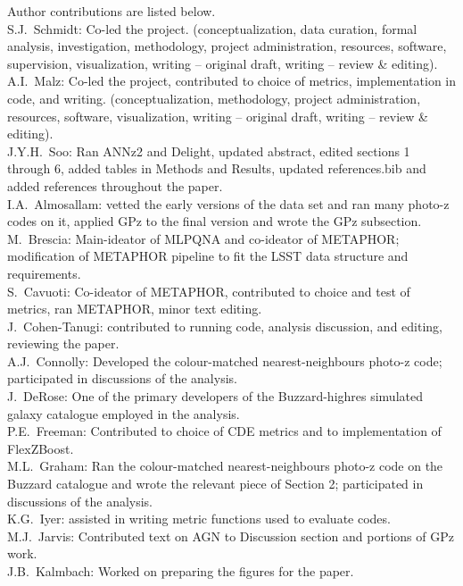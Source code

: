 Author contributions are listed below. \\
S.J.~Schmidt: Co-led the project. (conceptualization, data curation, formal analysis, investigation, methodology, project administration, resources, software, supervision, visualization, writing -- original draft, writing -- review \& editing). \\
A.I.~Malz: Co-led the project, contributed to choice of metrics, implementation in code, and writing. (conceptualization, methodology, project administration, resources, software, visualization, writing -- original draft, writing -- review \& editing). \\
J.Y.H.~Soo: Ran ANNz2 and Delight, updated abstract, edited sections 1 through 6, added tables in Methods and Results, updated references.bib and added references throughout the paper. \\
I.A.~Almosallam: vetted the early versions of the data set and ran many photo-z codes on it, applied GPz to the final version and wrote the GPz subsection. \\
M.~Brescia: Main-ideator of MLPQNA and co-ideator of METAPHOR; modification of METAPHOR pipeline to fit the LSST data structure and requirements. \\
S.~Cavuoti: Co-ideator of METAPHOR, contributed to choice and test of metrics, ran METAPHOR, minor text editing. \\
J.~Cohen-Tanugi: contributed to running code, analysis discussion, and editing, reviewing the paper. \\
A.J.~Connolly: Developed the colour-matched nearest-neighbours photo-z code; participated in discussions of the analysis. \\
J.~DeRose: One of the primary developers of the Buzzard-highres simulated galaxy catalogue employed in the analysis. \\
P.E.~Freeman: Contributed to choice of CDE metrics and to implementation of FlexZBoost. \\
M.L.~Graham: Ran the colour-matched nearest-neighbours photo-z code on the Buzzard catalogue and wrote the relevant piece of Section 2; participated in discussions of the analysis. \\
K.G.~Iyer: assisted in writing metric functions used to evaluate codes. \\
M.J.~Jarvis: Contributed text on AGN to Discussion section and portions of GPz work. \\
J.B.~Kalmbach: Worked on preparing the figures for the paper. \\
